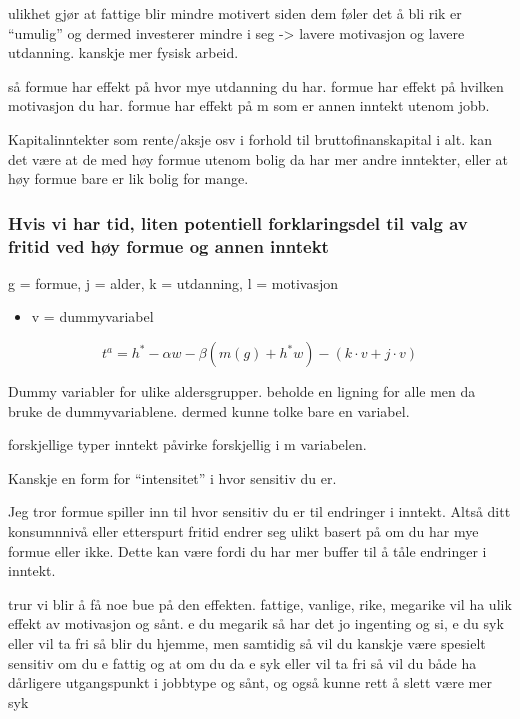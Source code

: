\documentclass[
  12pt,
  a4paper,
  DIV=11,
  numbers=noendperiod]{scrartcl}
\providecommand{\tightlist}{%
  \setlength{\itemsep}{0pt}\setlength{\parskip}{0pt}}\usepackage{longtable,booktabs,array}
\begin{document}
ulikhet gjør at fattige blir mindre motivert siden dem føler det å bli
rik er ``umulig'' og dermed investerer mindre i seg -\textgreater{}
lavere motivasjon og lavere utdanning. kanskje mer fysisk arbeid.

så formue har effekt på hvor mye utdanning du har. formue har effekt på
hvilken motivasjon du har. formue har effekt på m som er annen inntekt
utenom jobb.

Kapitalinntekter som rente/aksje osv i forhold til bruttofinanskapital i
alt. kan det være at de med høy formue utenom bolig da har mer andre
inntekter, eller at høy formue bare er lik bolig for mange.

\subsubsection{Hvis vi har tid, liten potentiell forklaringsdel til valg
av fritid ved høy formue og annen
inntekt}\label{hvis-vi-har-tid-liten-potentiell-forklaringsdel-til-valg-av-fritid-ved-huxf8y-formue-og-annen-inntekt}

g = formue, j = alder, k = utdanning, l = motivasjon

\begin{itemize}
\tightlist
\item
  v = dummyvariabel
\end{itemize}

\[
t^a = h^* - \alpha w - \beta(m(g) + h^*w) - (k\cdot v+j\cdot v)
\]

Dummy variabler for ulike aldersgrupper. beholde en ligning for alle men
da bruke de dummyvariablene. dermed kunne tolke bare en variabel.

forskjellige typer inntekt påvirke forskjellig i m variabelen.

Kanskje en form for ``intensitet'' i hvor sensitiv du er.

Jeg tror formue spiller inn til hvor sensitiv du er til endringer i
inntekt. Altså ditt konsumnnivå eller etterspurt fritid endrer seg ulikt
basert på om du har mye formue eller ikke. Dette kan være fordi du har
mer buffer til å tåle endringer i inntekt.

trur vi blir å få noe bue på den effekten. fattige, vanlige, rike,
megarike vil ha ulik effekt av motivasjon og sånt. e du megarik så har
det jo ingenting og si, e du syk eller vil ta fri så blir du hjemme, men
samtidig så vil du kanskje være spesielt sensitiv om du e fattig og at
om du da e syk eller vil ta fri så vil du både ha dårligere utgangspunkt
i jobbtype og sånt, og også kunne rett å slett være mer syk
\end{document}
